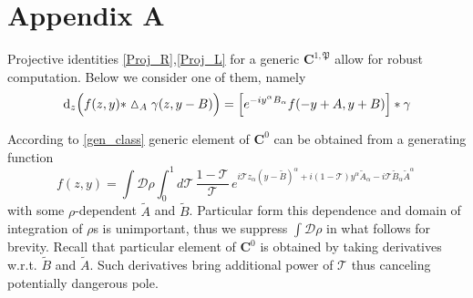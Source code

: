 \documentclass[12pt]{article}
\newcommand{\dr}{{{\rm d}}}
\renewcommand{\theequation}{\thesection.\arabic{equation}}
\newcommand{\hmt}{\vartriangle}
\begin{document}
\setcounter{appendix}{1}
\renewcommand{\theequation}{\Alph{appendix}.\arabic{equation}}
\addtocounter{section}{1} \setcounter{equation}{0}
 \renewcommand{\thesection}{\Alph{appendix}.}



\section*{Appendix A}\label{AppA}


Projective identities \eqref{Proj_R},\eqref{Proj_L} for a generic $\mathbf{C}^{1,\mathfrak{P}}$ allow for robust computation. Below we consider one of them, namely
\begin{equation}\label{Proj_R_A}
\dr_z\Big(f(z,y)\ast \hmt_A\gamma(z,y-B)\Big)=\Big[e^{-iy^\alpha B_\alpha} f(-y+A,y+B)\Big]\ast \gamma
\end{equation}

According to \eqref{gen_class} generic element of $\mathbf{C}^0$ can be obtained from a generating function 
\begin{equation}
f(z,y)=\int \mathscr{D}\rho \int_0^1d\mathcal{T}\, \frac{1-\mathcal{T}}{\mathcal{T}}\, e^{i\mathcal{T}z_\alpha (y-\tilde{B})^\alpha +i(1-\mathcal{T})y^\alpha \tilde{A}_\alpha-i\mathcal{T}\tilde{B}_\alpha \tilde{A}^\alpha}\,
\end{equation}
with some $\rho$-dependent $\tilde{A}$ and $\tilde{B}$. Particular form this dependence and domain of integration of $\rho$s is unimportant, thus we suppress $\int \mathscr{D}\rho$ in what follows for brevity.  Recall that particular element of $\mathbf{C}^0$ is obtained by taking derivatives w.r.t. $\tilde{B}$ and $\tilde{A}$. Such derivatives bring additional power of $\mathcal{T}$ thus canceling potentially dangerous pole. 
\end{document}
